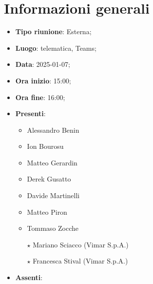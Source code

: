 \section{Informazioni generali}
\begin{itemize}
  \item \textbf{Tipo riunione}: Esterna;
  \item \textbf{Luogo}: telematica, Teams;
  \item \textbf{Data}: 2025-01-07;
  \item \textbf{Ora inizio}: 15:00;
  \item \textbf{Ora fine}: 16:00;
  
  \item \textbf{Presenti}:
  \begin{itemize}
    \item Alessandro Benin
    \item Ion Bourosu
    \item Matteo Gerardin
    \item Derek Gusatto
    \item Davide Martinelli
    \item Matteo Piron
    \item Tommaso Zocche
    \item[$\star$] Mariano Sciacco (Vimar S.p.A.)
    \item[$\star$] Francesca Stival (Vimar S.p.A.)
  \end{itemize}

  \item \textbf{Assenti}:
 
\end{itemize}
